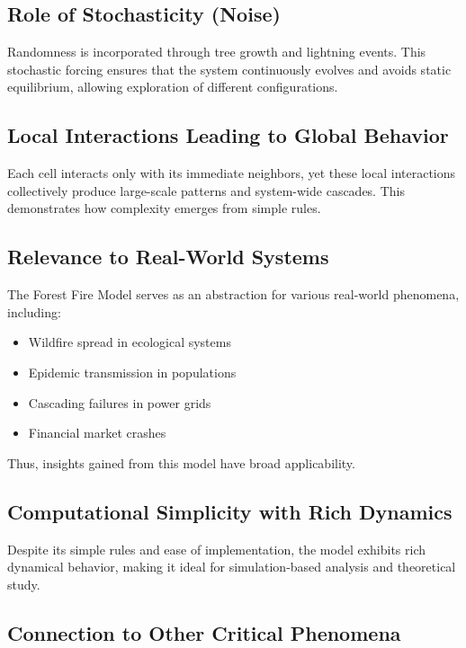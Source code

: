 \documentclass[12pt,a4paper]{article}
\begin{document}
\subsection{Role of Stochasticity (Noise)}

Randomness is incorporated through tree growth and lightning events. This stochastic forcing ensures that the system continuously evolves and avoids static equilibrium, allowing exploration of different configurations.

\subsection{Local Interactions Leading to Global Behavior}

Each cell interacts only with its immediate neighbors, yet these local interactions collectively produce large-scale patterns and system-wide cascades. This demonstrates how complexity emerges from simple rules.

\subsection{Relevance to Real-World Systems}

The Forest Fire Model serves as an abstraction for various real-world phenomena, including:
\begin{itemize}
\item Wildfire spread in ecological systems
\item Epidemic transmission in populations
\item Cascading failures in power grids
\item Financial market crashes
\end{itemize}

Thus, insights gained from this model have broad applicability.

\subsection{Computational Simplicity with Rich Dynamics}

Despite its simple rules and ease of implementation, the model exhibits rich dynamical behavior, making it ideal for simulation-based analysis and theoretical study.

\subsection{Connection to Other Critical Phenomena}
\end{document}
